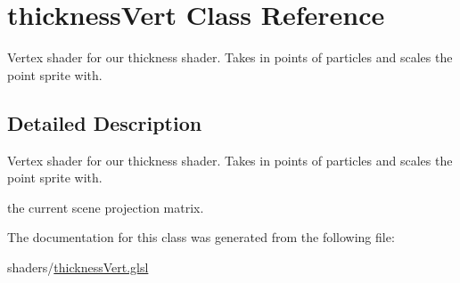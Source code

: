 \hypertarget{classthickness_vert}{\section{thickness\-Vert Class Reference}
\label{classthickness_vert}
}


Vertex shader for our thickness shader. Takes in points of particles and scales the point sprite with.  




\subsection{Detailed Description}
Vertex shader for our thickness shader. Takes in points of particles and scales the point sprite with. 

the current scene projection matrix. 

The documentation for this class was generated from the following file\-:\begin{DoxyCompactItemize}
\item 
shaders/\hyperlink{thickness_vert_8glsl}{thickness\-Vert.\-glsl}\end{DoxyCompactItemize}
